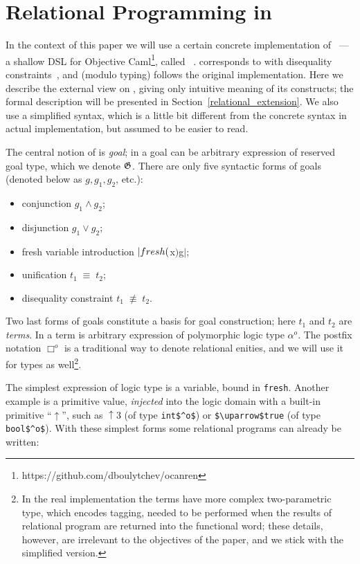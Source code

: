 \section{Relational Programming in \miniKanren}
\label{ocanren}

In the context of this paper we will use a certain concrete implementation of \miniKanren~--- a shallow DSL for Objective 
Caml\footnote{https://github.com/dboulytchev/ocanren}, called \ocanren~\cite{ocanren}. \ocanren corresponds to \miniKanren with
disequality constraints~\cite{CKanren}, and (modulo typing) follows the original implementation. Here we describe the external view 
on \ocanren, giving only intuitive meaning of its constructs; the formal description will be presented in Section~\ref{relational_extension}.
We also use a simplified syntax, which is a little bit different from the concrete syntax in actual implementation, but assumed to
be easier to read.

The central notion of \miniKanren is \emph{goal}; in \ocanren a goal can be arbitrary expression of reserved goal type, which we denote $\mathfrak G$.
There are only five syntactic forms of goals (denoted below as $g, g_1, g_2$, etc.):

\begin{itemize}
  \item conjunction $g_1\wedge g_2$;
  \item disjunction $g_1\vee g_2$;
  \item fresh variable introduction $\lstinline|fresh ($x$) $\;g$|$;
  \item unification $t_1\;\equiv\;t_2$;
  \item disequality constraint $t_1\;\not\equiv\;t_2$.
\end{itemize}

Two last forms of goals constitute a basis for goal construction; here $t_1$ and $t_2$ are \emph{terms}. In \ocanren a term is arbitrary expression of polymorphic logic type $\alpha^o$. The postfix notation $\Box^o$ is a traditional way to denote relational enities, and we will use it for types as well\footnote{In the real implementation the terms have more complex two-parametric type, which encodes tagging, needed to be performed when the results of relational program are returned into the functional word; these details, however, are irrelevant to the objectives of the paper, and we stick with the simplified version.}.

The simplest expression of logic type is a variable, bound in \lstinline|fresh|. Another example is a primitive value, \emph{injected} into the logic domain with a built-in primitive ``$\uparrow$'', such as $\uparrow\!3$ (of type \lstinline|int$^o$|) or \lstinline|$\uparrow$true| (of type \lstinline|bool$^o$|). With these simplest forms some relational programs can already be written:

